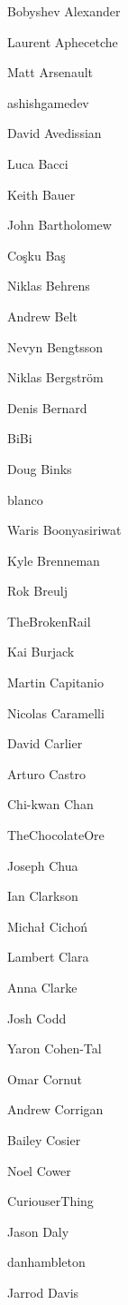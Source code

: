 \begin{DoxyItemize}
\item Bobyshev Alexander
\item Laurent Aphecetche
\item Matt Arsenault
\item ashishgamedev
\item David Avedissian
\item Luca Bacci
\item Keith Bauer
\item John Bartholomew
\item Coşku Baş
\item Niklas Behrens
\item Andrew Belt
\item Nevyn Bengtsson
\item Niklas Bergström
\item Denis Bernard
\item Bi\+Bi
\item Doug Binks
\item blanco
\item Waris Boonyasiriwat
\item Kyle Brenneman
\item Rok Breulj
\item The\+Broken\+Rail
\item Kai Burjack
\item Martin Capitanio
\item Nicolas Caramelli
\item David Carlier
\item Arturo Castro
\item Chi-\/kwan Chan
\item The\+Chocolate\+Ore
\item Joseph Chua
\item Ian Clarkson
\item Michał Cichoń
\item Lambert Clara
\item Anna Clarke
\item Josh Codd
\item Yaron Cohen-\/\+Tal
\item Omar Cornut
\item Andrew Corrigan
\item Bailey Cosier
\item Noel Cower
\item Curiouser\+Thing
\item Jason Daly
\item danhambleton
\item Jarrod Davis

\end{DoxyItemize}
